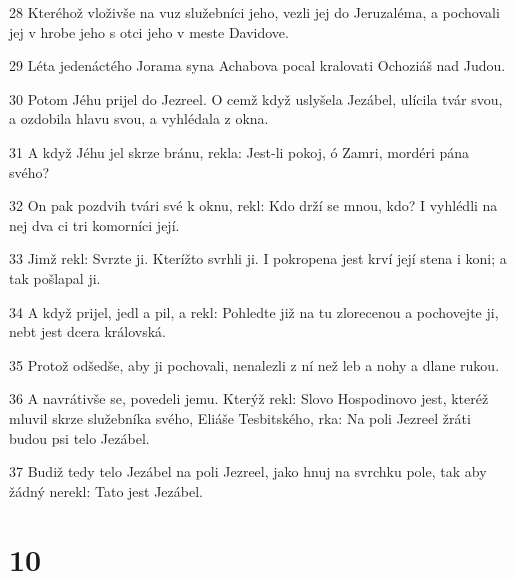\par 28 Kteréhož vloživše na vuz služebníci jeho, vezli jej do Jeruzaléma, a pochovali jej v hrobe jeho s otci jeho v meste Davidove.
\par 29 Léta jedenáctého Jorama syna Achabova pocal kralovati Ochoziáš nad Judou.
\par 30 Potom Jéhu prijel do Jezreel. O cemž když uslyšela Jezábel, ulícila tvár svou, a ozdobila hlavu svou, a vyhlédala z okna.
\par 31 A když Jéhu jel skrze bránu, rekla: Jest-li pokoj, ó Zamri, mordéri pána svého?
\par 32 On pak pozdvih tvári své k oknu, rekl: Kdo drží se mnou, kdo? I vyhlédli na nej dva ci tri komorníci její.
\par 33 Jimž rekl: Svrzte ji. Kterížto svrhli ji. I pokropena jest krví její stena i koni; a tak pošlapal ji.
\par 34 A když prijel, jedl a pil, a rekl: Pohledte již na tu zlorecenou a pochovejte ji, nebt jest dcera královská.
\par 35 Protož odšedše, aby ji pochovali, nenalezli z ní než leb a nohy a dlane rukou.
\par 36 A navrátivše se, povedeli jemu. Kterýž rekl: Slovo Hospodinovo jest, kteréž mluvil skrze služebníka svého, Eliáše Tesbitského, rka: Na poli Jezreel žráti budou psi telo Jezábel.
\par 37 Budiž tedy telo Jezábel na poli Jezreel, jako hnuj na svrchku pole, tak aby žádný nerekl: Tato jest Jezábel.

\chapter{10}

